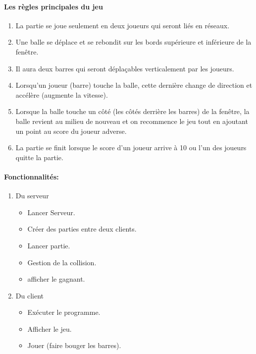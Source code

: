\documentclass[a4paper,oneside]{article}
\begin{document}
 	\paragraph{Les règles principales du jeu}
	 	\begin{enumerate}
	 		\item La partie se joue seulement en deux joueurs qui seront liés en	réseaux.
	 		\item Une balle se déplace et se rebondit sur les bords	
	 		supérieure et inférieure de la fenêtre.
	 		\item Il aura deux barres qui seront déplaçables verticalement par	les joueurs.
	 		\item Lorsqu'un joueur (barre) touche la balle, cette	
	 		dernière change de direction et accélère (augmente	
	 		la vitesse).
	 		\item Lorsque la balle touche un côté (les côtés derrière	
	 		les barres) de la fenêtre, la balle revient au milieu de nouveau	et on recommence le jeu tout en ajoutant un point au score du joueur adverse. 
	 		\item La partie se finit lorsque le score d'un joueur arrive
	 		à 10 ou l'un des joueurs quitte la partie.
	 		\end{enumerate}
	 		\paragraph{Fonctionnalités:}
			\begin{enumerate}
				\item Du serveur
				\begin{itemize}
					\item Lancer Serveur.
					\item Créer des parties entre deux clients.
					\item Lancer partie.
					\item Gestion de la collision.
					\item afficher le gagnant.
				\end{itemize} 	
				\item{Du client}
				\begin{itemize}
					\item Exécuter le programme.
					\item Afficher le jeu.
					\item Jouer (faire bouger les barres).
				\end{itemize}
					
			\end{enumerate}
\end{document}
